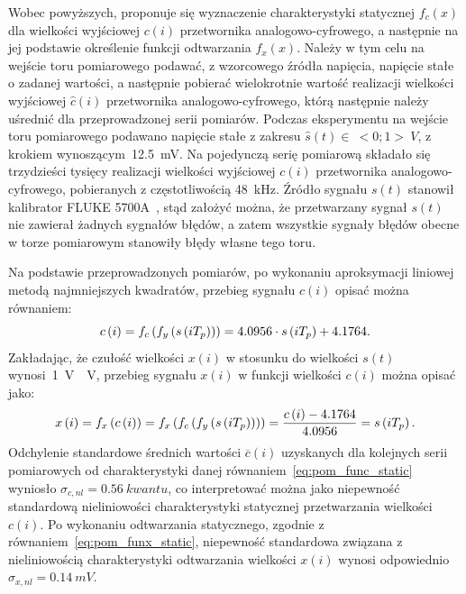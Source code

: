 Wobec powyższych, proponuje się wyznaczenie charakterystyki statycznej $f_{c}(x)$ dla wielkości wyjściowej $c(i)$ przetwornika analogowo-cyfrowego, a następnie na jej podstawie określenie funkcji odtwarzania $f_{x}(x)$. Należy w tym celu na wejście toru pomiarowego podawać, z wzorcowego źródła napięcia, napięcie stałe o zadanej wartości, a następnie pobierać wielokrotnie wartość realizacji wielkości wyjściowej $\hat{c}(i)$ przetwornika analogowo-cyfrowego, którą następnie należy uśrednić dla przeprowadzonej serii pomiarów. Podczas eksperymentu na wejście toru pomiarowego podawano napięcie stałe z zakresu $\hat{s}(t) \in~<0;1>~\unit{V}$, z krokiem wynoszącym~\qty{12.5}{mV}. Na pojedynczą serię pomiarową składało się trzydzieści tysięcy realizacji wielkości wyjściowej $c(i)$ przetwornika analogowo-cyfrowego, pobieranych z częstotliwością \qty{48}{kHz}. Źródło sygnału $s(t)$ stanowił kalibrator FLUKE 5700A~\cite{fluke_manual}, stąd założyć można, że przetwarzany sygnał $s(t)$ nie zawierał żadnych sygnałów błędów, a zatem wszystkie sygnały błędów obecne w torze pomiarowym stanowiły błędy własne tego toru.

Na podstawie przeprowadzonych pomiarów, po wykonaniu aproksymacji liniowej metodą najmniejszych kwadratów, przebieg sygnału $c(i)$ opisać można równaniem:
\begin{equation}
c \left(i\right) = f_{c} \left(f_{y} \left(s \left(iT_{p}\right)\right)\right) = 4.0956 \cdot s \left(iT_{p}\right) + 4.1764 \label{eq:pom_func_static}.
\end{equation}
Zakładając, że czułość wielkości $x(i)$ w stosunku do wielkości $s(t)$ wynosi~\qty{1}{V \per V}, przebieg sygnału $x(i)$ w funkcji wielkości $c(i)$ można opisać jako:
\begin{equation}
x \left(i\right) = f_{x} \left(c \left(i\right)\right) = f_{x} \left(f_{c} \left(f_{y} \left(s \left(iT_{p}\right)\right)\right)\right) = \frac{c \left(i\right) - 4.1764}{4.0956} = s \left(iT_{p}\right) \label{eq:pom_funx_static}.
\end{equation}
Odchylenie standardowe średnich wartości $\overline{c}(i)$ uzyskanych dla kolejnych serii pomiarowych od charakterystyki danej równaniem~\eqref{eq:pom_func_static} wyniosło $\sigma_{c,nl} = \qty{0.56}{kwantu}$, co interpretować można jako niepewność standardową nieliniowości charakterystyki statycznej przetwarzania wielkości $c(i)$. Po wykonaniu odtwarzania statycznego, zgodnie z równaniem~\eqref{eq:pom_funx_static}, niepewność standardowa związana z nieliniowością charakterystyki odtwarzania wielkości $x(i)$ wynosi odpowiednio $\sigma_{x,nl} = \qty{0.14}{mV}$.


